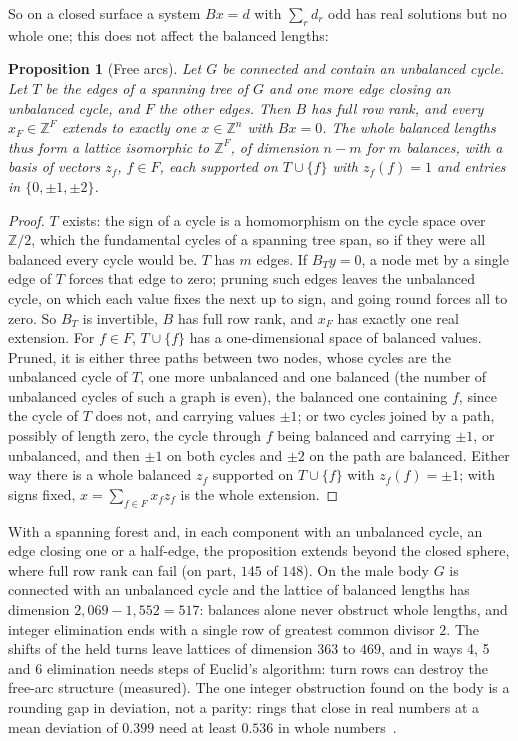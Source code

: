\documentclass[11pt,a4paper]{article}
\newtheorem{proposition}{Proposition}
\newcommand{\Z}{\mathbb{Z}}
\begin{document}
So on a closed surface a system $Bx = d$ with $\sum_r d_r$ odd has real
solutions but no whole one; this does not affect the balanced lengths:

\begin{proposition}[Free arcs]\label{prop:free}
Let $G$ be connected and contain an unbalanced cycle. Let $T$ be the edges of a
spanning tree of $G$ and one more edge closing an unbalanced cycle, and $F$ the
other edges. Then $B$ has full row rank, and every $x_F \in \Z^F$ extends to
exactly one $x \in \Z^n$ with $Bx = 0$. The whole balanced lengths thus form a
lattice isomorphic to $\Z^F$, of dimension $n - m$ for $m$ balances, with a
basis of vectors $z_f$, $f \in F$, each supported on $T \cup \{f\}$ with
$z_f(f) = 1$ and entries in $\{0, \pm1, \pm2\}$.
\end{proposition}

\begin{proof}
$T$ exists: the sign of a cycle is a homomorphism on the cycle space over
$\Z/2$, which the fundamental cycles of a spanning tree span, so if they were
all balanced every cycle would be. $T$ has $m$ edges. If $B_T y = 0$, a node
met by a single edge of $T$ forces that edge to zero; pruning such edges
leaves the unbalanced cycle, on which each value fixes the next up to sign,
and going round forces all to zero. So $B_T$ is invertible, $B$ has full row
rank, and $x_F$ has exactly one real extension. For $f \in F$, $T \cup \{f\}$
has a one-dimensional space of balanced values. Pruned, it is either three
paths between two nodes, whose cycles are the unbalanced cycle of $T$, one more
unbalanced and one balanced (the number of unbalanced cycles of such a graph
is even), the balanced one containing $f$, since the cycle of $T$ does not,
and carrying values $\pm1$; or two cycles joined by a path, possibly of length
zero, the cycle through $f$ being balanced and carrying $\pm1$, or unbalanced,
and then $\pm1$ on both cycles and $\pm2$ on the path are balanced. Either way
there is a whole balanced $z_f$ supported on $T \cup \{f\}$ with $z_f(f) =
\pm1$; with signs fixed, $x = \sum_{f \in F} x_f z_f$ is the whole extension.
\end{proof}

With a spanning forest and, in each component with an unbalanced cycle, an
edge closing one or a half-edge, the proposition extends beyond the closed
sphere, where full row rank can fail (on part, $145$ of $148$). On the male
body $G$ is connected with an unbalanced cycle and the lattice of balanced
lengths has dimension $2{,}069 - 1{,}552 = 517$: balances alone never obstruct
whole lengths, and integer elimination ends with a single row of greatest
common divisor $2$. The shifts of the held turns leave lattices of dimension
$363$ to $469$, and in ways 4, 5 and 6 elimination needs steps of Euclid's
algorithm: turn rows can destroy the free-arc structure (measured). The one
integer obstruction found on the body is a rounding gap in deviation, not a
parity: rings that close in real numbers at a mean deviation of $0.399$ need
at least $0.536$ in whole numbers~\cite[\S7]{gardent2026loops}.
\end{document}
